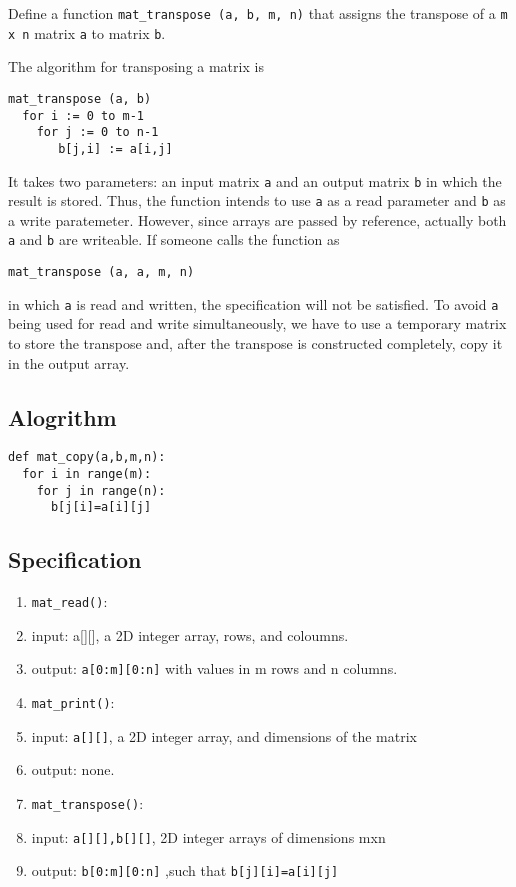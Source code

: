 \documentclass[11pt]{article}
\begin{document}
Define a function \texttt{mat\_transpose (a, b, m, n)} that
assigns the transpose of a \texttt{m x n} matrix \texttt{a} to matrix
\texttt{b}. 

The algorithm for transposing a matrix is
\linespread{1}
\begin{verbatim}
mat_transpose (a, b)
  for i := 0 to m-1
    for j := 0 to n-1
       b[j,i] := a[i,j]
\end{verbatim}
\linespread{1.2}
It takes two parameters: an input matrix \texttt{a} and an output
matrix \texttt{b} in which the result is stored.  Thus, the
function intends to use \texttt{a} as a read parameter and \texttt{b} as
a write paratemeter.
\linespread{1}
\linespread{1.2}
However, since arrays are passed by reference, actually
both \texttt{a} and \texttt{b} are writeable. If someone calls the
function as
\begin{verbatim}
mat_transpose (a, a, m, n)
\end{verbatim}
in which \texttt{a} is read and written, the specification will
not be satisfied.  To avoid \texttt{a} being used for read and
write simultaneously, we have to use a temporary matrix to
store the transpose and, after the transpose is
constructed completely, copy it in the output array.

\linespread{1}
\linespread{1.2}
\subsection*{Alogrithm}
\label{sec-7-1}
\begin{verbatim}
def mat_copy(a,b,m,n):
  for i in range(m):
    for j in range(n):
      b[j[i]=a[i][j]
\end{verbatim}
\subsection*{Specification}
\label{sec-7-2}
\begin{enumerate}
\item \texttt{mat\_read()}:
\item input: a[][], a 2D integer array, rows, and coloumns.
\item output: \texttt{a[0:m][0:n]} with values in m rows and n columns.
\item \texttt{mat\_print()}:
\item input: \texttt{a[][]}, a 2D integer array, and dimensions of the matrix
\item output: none.
\item \texttt{mat\_transpose()}:
\item input: \texttt{a[][],b[][]}, 2D integer arrays of dimensions mxn
\item output: \texttt{b[0:m][0:n]} ,such that \texttt{b[j][i]=a[i][j]}
\end{enumerate}
\end{document}
